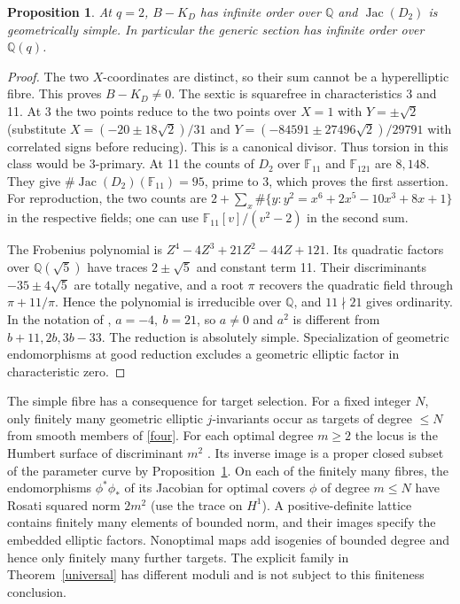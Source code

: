 \documentclass[11pt]{article}
\newtheorem{proposition}[theorem]{Proposition}
\newcommand{\Jac}{\operatorname{Jac}}
\newcommand{\Q}{\mathbb Q}
\newcommand{\F}{\mathbb F}
\begin{document}
\begin{proposition}\label{fourpt}
At $q=2$, $B-K_D$ has infinite order over $\Q$ and $\Jac(D_2)$ is
geometrically simple. In particular the generic section has infinite
order over $\Q(q)$.
\end{proposition}
\begin{proof}
The two $X$-coordinates are distinct, so their sum cannot be a
hyperelliptic fibre. This proves $B-K_D\ne0$. The sextic is squarefree
in characteristics 3 and 11. At 3 the two points reduce to the two
points over $X=1$ with $Y=\pm\sqrt2$ (substitute
$X=(-20\pm18\sqrt2)/31$ and $Y=(-84591\pm27496\sqrt2)/29791$ with correlated signs before reducing).
This is a canonical divisor. Thus torsion in this class would be
3-primary. At 11 the counts of $D_2$ over $\F_{11}$ and $\F_{121}$ are
$8,148$. They give $\#\Jac(D_2)(\F_{11})=95$, prime to 3,
which proves the first assertion. For reproduction, the two counts are
$2+\sum_x\#\{y:y^2=x^6+2x^5-10x^3+8x+1\}$ in the respective fields;
one can use $\F_{11}[v]/(v^2-2)$ in the second sum.

The Frobenius polynomial is
$Z^4-4Z^3+21Z^2-44Z+121$. Its quadratic factors over $\Q(\sqrt5)$
have traces $2\pm\sqrt5$ and constant term 11. Their discriminants
$-35\pm4\sqrt5$ are totally negative, and a root $\pi$ recovers the
quadratic field through $\pi+11/\pi$. Hence the polynomial is
irreducible over $\Q$, and $11\nmid21$ gives ordinarity.
In the notation of \cite[Theorem 6]{HZ}, $a=-4,\ b=21$, so
$a\ne0$ and $a^2$ is different from $b+11,2b,3b-33$. The reduction is
absolutely simple. Specialization of geometric endomorphisms at good
reduction excludes a geometric elliptic factor in characteristic zero.
\end{proof}

The simple fibre has a consequence for target selection. For a fixed
integer $N$, only finitely many geometric elliptic $j$-invariants occur
as targets of degree $\le N$ from smooth members of \eqref{four}. For
each optimal degree $m\ge2$ the locus is the Humbert surface of
discriminant $m^2$ \cite{Kumar}. Its inverse image is a proper closed
subset of the parameter curve by Proposition~\ref{fourpt}. On each
of the finitely many fibres, the endomorphisms
$\phi^*\phi_*$ of its Jacobian for optimal covers $\phi$ of degree
$m\le N$ have Rosati squared norm $2m^2$ (use the trace on $H^1$).
A positive-definite lattice contains finitely many elements of bounded
norm, and their images specify the embedded elliptic factors. Nonoptimal
maps add isogenies of bounded degree and hence only finitely many
further targets. The explicit family in Theorem~\ref{universal} has
different moduli and is not subject to this finiteness conclusion.
\end{document}

